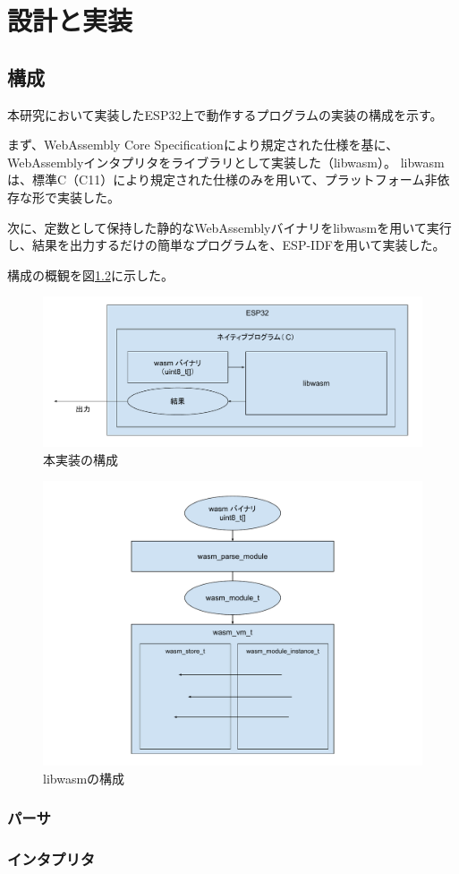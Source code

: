 \chapter{設計と実装}
\label{chap:implementation}

\section{構成}

本研究において実装したESP32上で動作するプログラムの実装の構成を示す。

まず、WebAssembly Core Specification\cite{wasm_spec}により規定された仕様を基に、WebAssemblyインタプリタをライブラリとして実装した（libwasm）。
libwasmは、標準C（C11）により規定された仕様のみを用いて、プラットフォーム非依存な形で実装した。

次に、定数として保持した静的なWebAssemblyバイナリをlibwasmを用いて実行し、結果を出力するだけの簡単なプログラムを、ESP-IDF\cite{esp_idf}を用いて実装した。

構成の概観を図\ref{fig:libwasm_arch}に示した。

\begin{figure}[htbp]
  \caption{本実装の構成}
  \label{fig:libwasm_arch}
  \begin{center}
    \includegraphics[bb=0 0 800 300,width=12cm]{img/esp32_libwasm.pdf}
  \end{center}
\end{figure}

\begin{figure}[htbp]
  \caption{libwasmの構成}
  \label{fig:libwasm_arch}
  \begin{center}
    \includegraphics[bb=0 0 800 600,width=12cm]{img/libwasm_arch.pdf}
  \end{center}
\end{figure}

\subsection{パーサ}

\subsection{インタプリタ}

